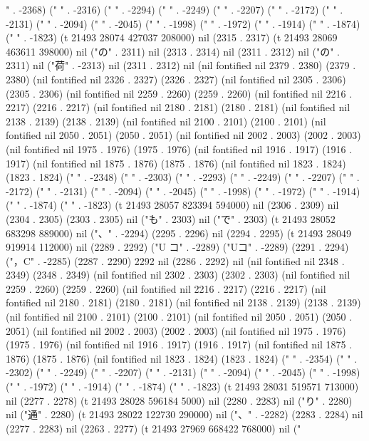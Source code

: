 " . -2368) ("
" . -2316) ("
" . -2294) ("
" . -2249) ("
" . -2207) ("
" . -2172) ("
" . -2131) ("
" . -2094) ("
" . -2045) ("
" . -1998) ("
" . -1972) ("
" . -1914) ("
" . -1874) ("
" . -1823) (t 21493 28074 427037 208000) nil (2315 . 2317) (t 21493 28069 463611 398000) nil ("の" . 2311) nil (2313 . 2314) nil (2311 . 2312) nil ("の" . 2311) nil ("荷" . -2313) nil (2311 . 2312) nil (nil fontified nil 2379 . 2380) (2379 . 2380) (nil fontified nil 2326 . 2327) (2326 . 2327) (nil fontified nil 2305 . 2306) (2305 . 2306) (nil fontified nil 2259 . 2260) (2259 . 2260) (nil fontified nil 2216 . 2217) (2216 . 2217) (nil fontified nil 2180 . 2181) (2180 . 2181) (nil fontified nil 2138 . 2139) (2138 . 2139) (nil fontified nil 2100 . 2101) (2100 . 2101) (nil fontified nil 2050 . 2051) (2050 . 2051) (nil fontified nil 2002 . 2003) (2002 . 2003) (nil fontified nil 1975 . 1976) (1975 . 1976) (nil fontified nil 1916 . 1917) (1916 . 1917) (nil fontified nil 1875 . 1876) (1875 . 1876) (nil fontified nil 1823 . 1824) (1823 . 1824) ("
" . -2348) ("
" . -2303) ("
" . -2293) ("
" . -2249) ("
" . -2207) ("
" . -2172) ("
" . -2131) ("
" . -2094) ("
" . -2045) ("
" . -1998) ("
" . -1972) ("
" . -1914) ("
" . -1874) ("
" . -1823) (t 21493 28057 823394 594000) nil (2306 . 2309) nil (2304 . 2305) (2303 . 2305) nil ("も" . 2303) nil ("で" . 2303) (t 21493 28052 683298 889000) nil ("、" . -2294) (2295 . 2296) nil (2294 . 2295) (t 21493 28049 919914 112000) nil (2289 . 2292) ("U コ" . -2289) ("Uコ" . -2289) (2291 . 2294) ("，C" . -2285) (2287 . 2290) 2292 nil (2286 . 2292) nil (nil fontified nil 2348 . 2349) (2348 . 2349) (nil fontified nil 2302 . 2303) (2302 . 2303) (nil fontified nil 2259 . 2260) (2259 . 2260) (nil fontified nil 2216 . 2217) (2216 . 2217) (nil fontified nil 2180 . 2181) (2180 . 2181) (nil fontified nil 2138 . 2139) (2138 . 2139) (nil fontified nil 2100 . 2101) (2100 . 2101) (nil fontified nil 2050 . 2051) (2050 . 2051) (nil fontified nil 2002 . 2003) (2002 . 2003) (nil fontified nil 1975 . 1976) (1975 . 1976) (nil fontified nil 1916 . 1917) (1916 . 1917) (nil fontified nil 1875 . 1876) (1875 . 1876) (nil fontified nil 1823 . 1824) (1823 . 1824) ("
" . -2354) ("
" . -2302) ("
" . -2249) ("
" . -2207) ("
" . -2131) ("
" . -2094) ("
" . -2045) ("
" . -1998) ("
" . -1972) ("
" . -1914) ("
" . -1874) ("
" . -1823) (t 21493 28031 519571 713000) nil (2277 . 2278) (t 21493 28028 596184 5000) nil (2280 . 2283) nil ("り" . 2280) nil ("通" . 2280) (t 21493 28022 122730 290000) nil ("、" . -2282) (2283 . 2284) nil (2277 . 2283) nil (2263 . 2277) (t 21493 27969 668422 768000) nil ("

